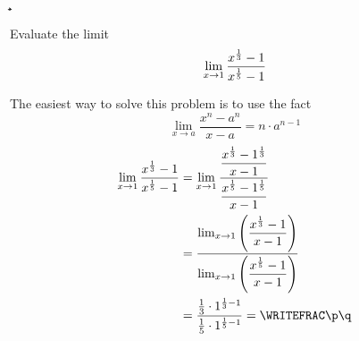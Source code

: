 

\a\b
{}\c\d
{}\vbthree\p\q

\question[4] Evaluate the limit \[ \lim_{x\to1}\dfrac{x^{\frac{1}{3}}-1}{x^{\frac{1}{5}}-1}\]

\watchout[-30pt]

\begin{solution}[\halfpage]
  The easiest way to solve this problem is to use the fact \[ \lim_{x\to a}\dfrac{x^n-a^n}{x-a} = n\cdot a^{n-1}\]
  \begin{align}
    \lim_{x\to\vbone}\dfrac{x^{\frac{1}\vbtwo}-1}{x^{\frac{1}\vbthree}-1} &= 
    \lim_{x\to\vbone}\dfrac{\dfrac{x^{\frac{1}\vbtwo}-\vbone^{\frac{1}\vbtwo}}{x-\vbone}}
    {\dfrac{x^{\frac{1}\vbthree}-\vbone^{\frac{1}\vbthree}}{x-\vbone}} \\
    &= \dfrac{\lim_{x\to\vbone}\left(\dfrac{x^{\frac{1}\vbtwo}-\vbone}{x-\vbone}\right)}
    {\lim_{x\to\vbone}\left(\dfrac{x^{\frac{1}{\vbthree}}-\vbone}{x-\vbone} \right)} \\
    &= \dfrac{\frac{1}{\vbtwo}\cdot\vbone^{\frac{1}\vbtwo - 1}}
    {\frac{1}{\vbthree}\cdot\vbone^{\frac{1}{\vbthree} - 1}} = \WRITEFRAC\p\q
  \end{align}
\end{solution}


